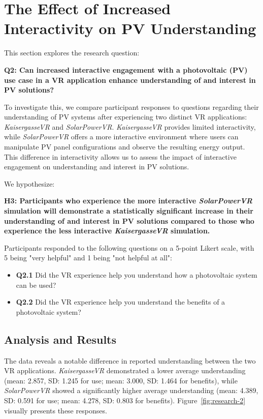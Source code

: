 \documentclass[draft, final]{vutinfth} %
\begin{document}
\section{The Effect of Increased Interactivity on PV Understanding}

This section explores the research question:

\textbf{Q2: Can increased interactive engagement with a photovoltaic (PV) use case in a VR application enhance understanding of and interest in PV solutions?}

To investigate this, we compare participant responses to questions regarding their understanding of PV systems after experiencing two distinct VR applications: \textit{KaisergasseVR} and \textit{SolarPowerVR}. \textit{KaisergasseVR} provides  limited interactivity, while \textit{SolarPowerVR} offers a more interactive environment where users can manipulate PV panel configurations and observe the resulting energy output. This difference in interactivity allows us to assess the impact of interactive engagement on understanding and interest in PV solutions.

We hypothesize:

\textbf{H3: Participants who experience the more interactive \textit{SolarPowerVR} simulation will demonstrate a statistically significant increase in their understanding of and interest in PV solutions compared to those who experience the less interactive \textit{KaisergasseVR} simulation.}

Participants responded to the following questions on a 5-point Likert scale, with 5 being "very helpful" and 1 being "not helpful at all":

\begin{itemize}
    \item \textbf{Q2.1} Did the VR experience help you understand how a photovoltaic system can be used?
    \item \textbf{Q2.2} Did the VR experience help you understand the benefits of a photovoltaic system?
\end{itemize}

\subsection{Analysis and Results}

The data reveals a notable difference in reported understanding between the two VR applications. \textit{KaisergasseVR} demonstrated a lower average understanding (mean: 2.857, SD: 1.245 for use; mean: 3.000, SD: 1.464 for benefits), while \textit{SolarPowerVR} showed a significantly higher average understanding (mean: 4.389, SD: 0.591 for use; mean: 4.278, SD: 0.803 for benefits). Figure~\ref{fig:research-2} visually presents these responses.
\end{document}
